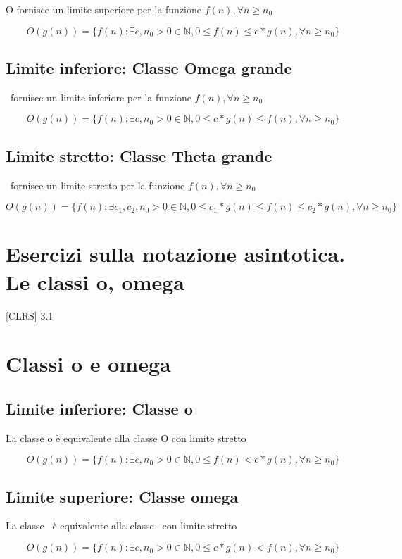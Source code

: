 O fornisce un limite superiore per la funzione $f(n), \forall n \geq n_0$

\begin{equation}
O(g(n)) = \{f(n) : \exists c,n_0 > 0 \in \mathbb{N}, 0 \leq f(n) \leq c*g(n), \forall n \geq n_0 \}
\end{equation}

\subsection{Limite inferiore: Classe Omega grande}

\Omega\, fornisce un limite inferiore per la funzione $f(n), \forall n \geq n_0$

\begin{equation}
O(g(n)) = \{f(n) : \exists c,n_0 > 0 \in \mathbb{N}, 0 \leq c*g(n) \leq f(n), \forall n \geq n_0 \}
\end{equation}

\subsection{Limite stretto: Classe Theta grande}

\Theta\, fornisce un limite stretto per la funzione $f(n), \forall n \geq n_0$

\begin{equation}
O(g(n)) = \{f(n) : \exists c_1,c_2,n_0 > 0 \in \mathbb{N}, 0 \leq c_1*g(n) \leq f(n) \leq  c_2*g(n), \forall n \geq n_0 \}
\end{equation}

\section{Esercizi sulla notazione asintotica. Le classi o, omega}

{{[}CLRS{]} 3.1}

\section{Classi o e omega}

\subsection{Limite inferiore: Classe o}

La classe o è equivalente alla classe O con limite stretto

\begin{equation}
O(g(n)) = \{f(n) : \exists c,n_0 > 0 \in \mathbb{N}, 0 \leq f(n) < c*g(n), \forall n \geq n_0 \}
\end{equation}

\subsection{Limite superiore: Classe omega}

La classe \omega\, è equivalente alla classe \Omega\, con limite stretto

\begin{equation}
O(g(n)) = \{f(n) : \exists c,n_0 > 0 \in \mathbb{N}, 0 \leq c*g(n) < f(n), \forall n \geq n_0 \}
\end{equation}
